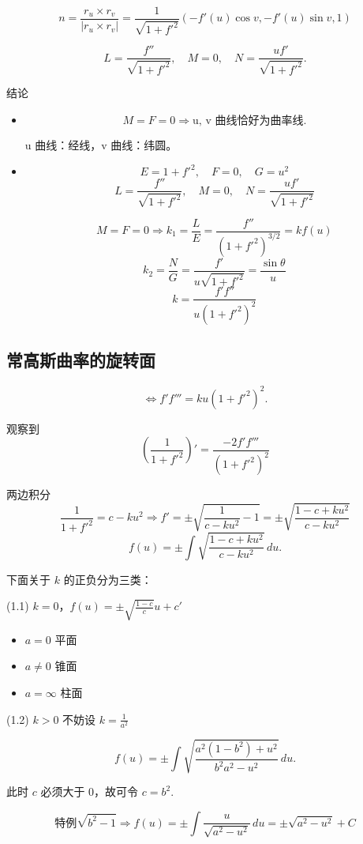 \documentclass[lang=cn,10pt,thmcnt=section]{elegantbook}
\begin{document}
\[
n = \frac{r_{u} \times r_{v}}{|r_{u} \times r_{v}|} = \frac{1}{\sqrt{1 + f'^2}} (-f'(u)\cos v, -f'(u)\sin v, 1)
\]

\[
L = \frac{f''}{\sqrt{1 + f'^2}}, \quad M = 0, \quad N = \frac{uf'}{\sqrt{1 + f'^2}}.
\]

结论
\begin{itemize}
    \item \[
\boxed{M = F = 0} \Rightarrow \text{u, v 曲线恰好为曲率线}.
\]

u 曲线：经线，v 曲线：纬圆。

    \item \[
E = 1 + f'^2, \quad F = 0, \quad G = u^2
\]
\[
L = \frac{f''}{\sqrt{1 + f'^2}}, \quad M = 0, \quad N = \frac{u f'}{\sqrt{1 + f'^2}}
\]

\[
\boxed{M = F = 0} \Rightarrow k_1 = \frac{L}{E} = \frac{f''}{(1 + f'^2)^{3/2}} = k f(u)
\]
\[
k_2 = \frac{N}{G} = \frac{f'}{u \sqrt{1 + f'^2}} = \frac{\sin \theta}{u}
\]
\[
k = \frac{f' f''}{u (1 + f'^2)^2}
\]

\end{itemize}
\subsection{常高斯曲率的旋转面}
\[
\Leftrightarrow f'f''' = ku(1 + f'^2)^2.
\]

观察到
\[
\left(\frac{1}{1 + f'^2}\right)' = \frac{-2f'f'''}{(1 + f'^2)^2}
\]

两边积分
\[
\frac{1}{1 + f'^2} = c - ku^2 \Rightarrow f' = \pm \sqrt{\frac{1}{c - ku^2} - 1} = \pm \sqrt{\frac{1 - c + ku^2}{c - ku^2}}
\]
\[
f(u) = \pm \int \sqrt{\frac{1 - c + ku^2}{c - ku^2}} \, du.
\]

下面关于 $k$ 的正负分为三类：

(1.1) $k = 0$，$f(u) = \pm \sqrt{\frac{1 - c}{c}} u + c'$

\begin{itemize}
    \item $a = 0$ 平面
    \item $a \neq 0$ 锥面
    \item $a = \infty$ 柱面
\end{itemize}

(1.2) $k > 0$ 不妨设 $k = \frac{1}{a^2}$

\[
f(u) = \pm \int \sqrt{\frac{a^2(1 - b^2) + u^2}{b^2a^2 - u^2}} \, du.
\]

此时 $c$ 必须大于 0，故可令 $c = b^2$.

\[
\text{特例} \sqrt{b^2 - 1} \Rightarrow f(u) = \pm \int \frac{u}{\sqrt{a^2 - u^2}} \, du = \pm \sqrt{a^2 - u^2} + C
\]
\end{document}

